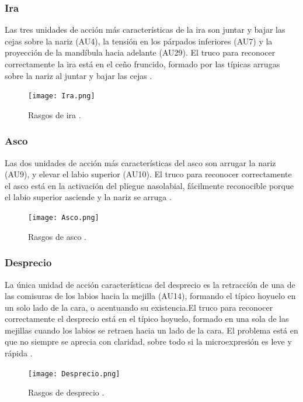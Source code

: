\subsubsection*{Ira}
Las tres unidades de acción más características de la ira son juntar y bajar las cejas sobre la nariz (AU4), la tensión en los párpados inferiores (AU7) y la proyección de la mandíbula hacia adelante (AU29). El truco para reconocer correctamente la ira está en el ceño fruncido, formado por las típicas arrugas sobre la nariz al juntar y bajar las cejas \cite{ReconocerLasEmociones}.

\begin{figure}[h]
    \centering
    \texttt{[image: Ira.png]}
    \caption{Rasgos de ira \cite{ReconocerLasEmociones}.}
    \label{fig:Ira}
\end{figure}

\subsubsection*{Asco}
Las dos unidades de acción más características del asco son arrugar la nariz (AU9), y elevar el labio superior (AU10). El truco para reconocer correctamente el asco está en la activación del pliegue nasolabial, fácilmente reconocible porque el labio superior asciende y la nariz se arruga \cite{ReconocerLasEmociones}.

\begin{figure}[h]
    \centering
    \texttt{[image: Asco.png]}
    \caption{Rasgos de asco \cite{ReconocerLasEmociones}.}
    \label{fig:Asco}
\end{figure}

\subsubsection*{Desprecio}
La única unidad de acción características del desprecio es la retracción de una de las comisuras de los labios hacia la mejilla (AU14), formando el típico hoyuelo en un solo lado de la cara, o acentuando su existencia.El truco para reconocer correctamente el desprecio está en el típico hoyuelo, formado en una sola de las mejillas cuando los labios se retraen hacia un lado de la cara. El problema está en que no siempre se aprecia con claridad, sobre todo si la microexpresión es leve y rápida \cite{ReconocerLasEmociones}.

\begin{figure}[h]
    \centering
    \texttt{[image: Desprecio.png]}
    \caption{Rasgos de desprecio \cite{ReconocerLasEmociones}.}
    \label{fig:Desprecio}
\end{figure}

